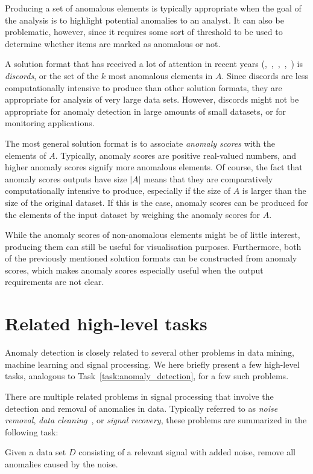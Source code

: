Producing a set of anomalous elements is typically appropriate when the goal of the analysis is to highlight potential anomalies to an analyst. It can also be problematic, however, since it requires some sort of threshold to be used to determine whether items are marked as anomalous or not.

A solution format that has received a lot of attention in recent years (\cite{keogh1},~\cite{bu},~\cite{yankov},~\cite{fu},~\cite{lin}) is \emph{discords}, or the set of the $k$ most anomalous elements in $A$. Since discords are less computationally intensive to produce than other solution formats, they are appropriate for analysis of very large data sets. However, discords might not be appropriate for anomaly detection in large amounts of small datasets, or for monitoring applications.

The most general solution format is to associate \emph{anomaly scores} with the elements of $A$. Typically, anomaly scores are positive real-valued numbers, and higher anomaly scores signify more anomalous elements. Of course, the fact that anomaly scores outputs have size $|A|$ means that they are comparatively computationally intensive to produce, especially if the size of $A$ is larger than the size of the original dataset. If this is the case, anomaly scores can be produced for the elements of the input dataset by weighing the anomaly scores for $A$.

While the anomaly scores of non-anomalous elements might be of little interest, producing them can still be useful for visualisation purposes. Furthermore, both of the previously mentioned solution formats can be constructed from anomaly scores, which makes anomaly scores especially useful when the output requirements are not clear.

\section{Related high-level tasks}
\label{sect:related_tasks}

Anomaly detection is closely related to several other problems in data mining, machine learning and signal processing. We here briefly present a few high-level tasks, analogous to Task~\ref{task:anomaly_detection}, for a few such problems.

There are multiple related problems in signal processing that involve the detection and removal of anomalies in data. Typically referred to as \emph{noise removal}, \emph{data cleaning}~\cite{meckesheimer}, or \emph{signal recovery}, these problems are summarized in the following task:
\begin{task}
  Given a data set $D$ consisting of a relevant signal with added noise, remove all anomalies caused by the noise.
\end{task}

